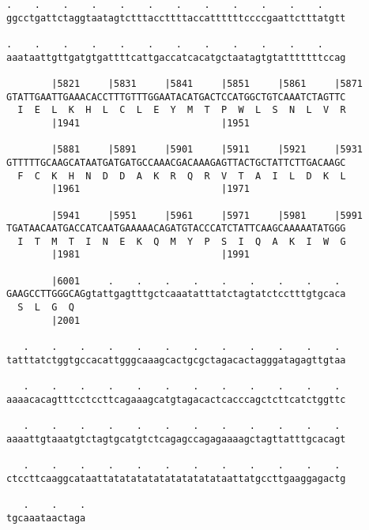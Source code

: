 \documentclass{article}
\begin{document}
\begin{Verbatim}
.    .    .    .    .    .    .    .    .    .    .    .    
ggcctgattctaggtaatagtctttaccttttaccattttttccccgaattctttatgtt
                                                            
.    .    .    .    .    .    .    .    .    .    .    .    
aaataattgttgatgtgattttcattgaccatcacatgctaatagtgtatttttttccag
                                                            
        |5821     |5831     |5841     |5851     |5861     |5871
GTATTGAATTGAAACACCTTTGTTTGGAATACATGACTCCATGGCTGTCAAATCTAGTTC
  I  E  L  K  H  L  C  L  E  Y  M  T  P  W  L  S  N  L  V  R
        |1941                         |1951                 
  
        |5881     |5891     |5901     |5911     |5921     |5931
GTTTTTGCAAGCATAATGATGATGCCAAACGACAAAGAGTTACTGCTATTCTTGACAAGC
  F  C  K  H  N  D  D  A  K  R  Q  R  V  T  A  I  L  D  K  L
        |1961                         |1971                 
  
        |5941     |5951     |5961     |5971     |5981     |5991
TGATAACAATGACCATCAATGAAAAACAGATGTACCCATCTATTCAAGCAAAAATATGGG
  I  T  M  T  I  N  E  K  Q  M  Y  P  S  I  Q  A  K  I  W  G
        |1981                         |1991                 
  
        |6001     .    .    .    .    .    .    .    .    . 
GAAGCCTTGGGCAGgtattgagtttgctcaaatatttatctagtatctcctttgtgcaca
  S  L  G  Q                                                
        |2001                                               
  
   .    .    .    .    .    .    .    .    .    .    .    . 
tatttatctggtgccacattgggcaaagcactgcgctagacactagggatagagttgtaa
                                                            
   .    .    .    .    .    .    .    .    .    .    .    . 
aaaacacagtttcctccttcagaaagcatgtagacactcacccagctcttcatctggttc
                                                            
   .    .    .    .    .    .    .    .    .    .    .    . 
aaaattgtaaatgtctagtgcatgtctcagagccagagaaaagctagttatttgcacagt
                                                            
   .    .    .    .    .    .    .    .    .    .    .    . 
ctccttcaaggcataattatatatatatatatatatataattatgccttgaaggagactg
                                                            
   .    .    .
tgcaaataactaga
              
              
 

\end{Verbatim}
\end{document}
